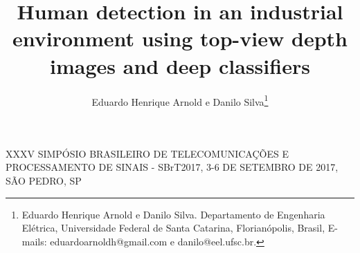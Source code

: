 \documentclass{sbrt2017port}
\begin{document}
\title{Human detection in an industrial environment using top-view depth images and deep classifiers}

\author{Eduardo Henrique Arnold e Danilo Silva\thanks{Eduardo Henrique Arnold e Danilo Silva. Departamento de Engenharia Elétrica, Universidade Federal de Santa Catarina, Florianópolis, Brasil, E-mails: eduardoarnoldh@gmail.com e danilo@eel.ufsc.br. } }

\maketitle

 {XXXV SIMPÓSIO BRASILEIRO DE TELECOMUNICAÇÕES E PROCESSAMENTO DE SINAIS - SBrT2017, 3-6 DE SETEMBRO DE 2017, SÃO PEDRO, SP}



\nocite{*}


\end{document}
